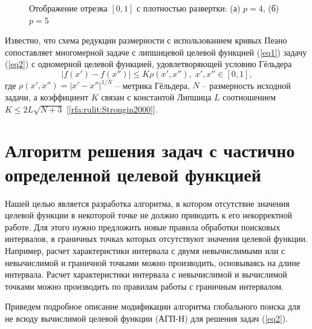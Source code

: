 \documentclass[a4paper,12pt,russian]{article}
\begin{document}
\begin{figure}[h!]
	\caption{Отображение отрезка $[0,1]$ с плотностью развертки: (а) $p=4$, (б) $p=5$}
	\label{fig_peano}
\end{figure}

Известно, что схема редукции размерности с использованием кривых Пеано сопоставляет многомерной задаче с липшицевой целевой функцией (\ref{eq1}) задачу (\ref{eq2}) с одномерной целевой функцией, удовлетворяющей условию Гёльдера
\begin{equation}\label{eq4} 
| f(x')-f(x'') | \leq K \rho(x',x''), \; x',x'' \in [0,1],
\end{equation}
где $\rho(x',x'') =  |x' - x''|^{1/N}$ -- метрика Гёльдера, $N$ -- размерность исходной задачи, а коэффициент $K$ связан с константой Липшица $L$ соотношением $K \leq 2L\sqrt {N+3}$ [\ref{rfa:rulit:Strongin2000}].

\section{Алгоритм решения задач с частично определенной целевой функцией}

Нашей целью является разработка алгоритма, в котором отсутствие значения целевой функции в некоторой точке не должно приводить к его некорректной работе. 
Для этого нужно предложить новые правила обработки поисковых интервалов, в граничных точках которых отсутствуют значения целевой функции. Например, расчет характеристики интервала с двумя невычислимыми или с невычислимой и граничной точками можно производить, основываясь на длине интервала. Расчет характеристики интервала с невычислимой и вычислимой точками можно производить по правилам работы с граничным интервалом.

Приведем подробное описание модификации алгоритма глобального поиска для не всюду вычислимой целевой функции (АГП-Н) для решения задач (\ref{eq2}).
\end{document}
